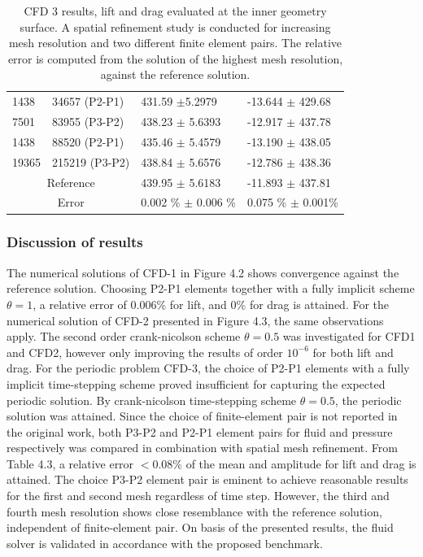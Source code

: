 \begin{table}[h!]
\begin{tabular}{ |p{1cm}||p{2.9cm}|p{3.3cm}|p{3.3cm}|}
 \hline
 1438    & 34657  (P2-P1)   & 431.59 $\pm$5.2979 & -13.644   $\pm$ 429.68 \\
 7501    & 83955 (P3-P2)  & 438.23      $\pm$  5.6393 & -12.917 $\pm$  437.78 \\
 \hline
 1438    & 88520  (P2-P1)   & 435.46  $\pm$ 5.4579 & -13.190   $\pm$ 438.05 \\
 19365   & 215219 (P3-P2)  & 438.84    $\pm$  5.6576 & -12.786      $\pm$  438.36 \\
\hline
 \multicolumn{2}{|c|}{Reference}  & 439.95 $\pm$ 5.6183 & -11.893 $\pm$ 437.81\\
 \hline
  \multicolumn{2}{|c|}{Error}  & 0.002 \% $\pm$ 0.006 \% & 0.075 \% $\pm$ 0.001\% \\
  \hline
\end{tabular}
\caption{CFD 3 results, lift and drag evaluated at the inner geometry surface. A spatial refinement study is conducted for increasing mesh resolution and two different finite element pairs. The relative error is computed from the solution of the highest mesh resolution, against the reference solution.}
\end{table}
\newpage
\subsubsection*{Discussion of results}
The numerical solutions of CFD-1 in Figure 4.2 shows convergence against the reference solution. Choosing P2-P1 elements together with a fully implicit scheme $\theta = 1$, a relative error of $0.006 \%$ for lift, and $0\%$ for drag is attained. For the numerical solution of CFD-2 presented in Figure 4.3, the same observations apply. The second order crank-nicolson scheme  $\theta = 0.5$ was investigated for CFD1 and CFD2, however only improving the results of order $10^{-6}$ for both lift and drag. For the periodic problem CFD-3, the choice of  P2-P1 elements with a fully implicit time-stepping scheme proved insufficient for capturing the expected periodic solution.  By crank-nicolson time-stepping scheme $\theta = 0.5$, the periodic solution was attained. Since the choice of finite-element pair is not reported in the original work, both P3-P2 and P2-P1 element pairs for fluid and pressure respectively was compared in combination with spatial mesh refinement. From Table 4.3, a relative error $ < 0.08\%$ of the mean and amplitude for lift and drag is attained. The choice P3-P2 element pair is eminent to achieve reasonable results for the first and second mesh regardless of time step.  However, the third and fourth mesh resolution shows close resemblance with the reference solution, independent of finite-element pair. On basis of the presented results, the fluid solver is validated in accordance with the proposed benchmark. 

